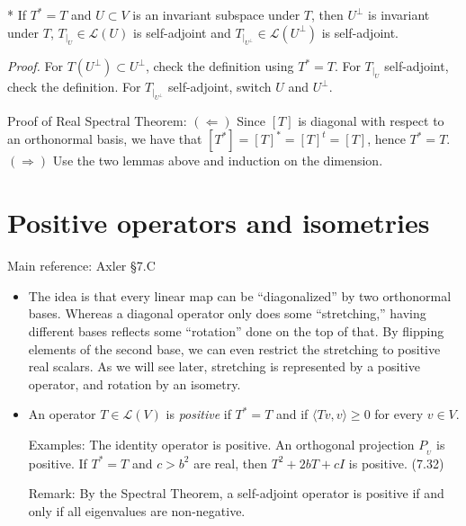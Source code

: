 \documentclass[11pt]{article}
\newcommand{\1}{\mathbf{1}}
\newcommand{\proj}[1]{P_{\!\!{}_{#1}}}
\newcommand{\0}{\mathbf{0}}
\renewcommand{\geq}{\geqslant}
\begin{document}
{\begin{itemize}
*
If $T^*=T$ and $U\subset V$ is an invariant subspace under $T$, then $U^\perp$ is invariant under $T$, $T_{|_U}\in{\mathcal{L}(U)}$ is self-adjoint and $T_{|_{U^\perp}}\in{\mathcal{L}(U^\perp)}$ is self-adjoint.

\emph{Proof.}
For $T(U^\perp) \subset U^\perp$, check the definition using $T^*=T$.
For $T_{|_{U}}$ self-adjoint, check the definition.
For $T_{|_{U^\perp}}$ self-adjoint, switch $U$ and $U^\perp$.

Proof of Real Spectral Theorem:
$(\Leftarrow)$
Since $[T]$ is diagonal with respect to an orthonormal basis, we have that $[T^*]=[T]^*=[T]^t=[T]$, hence $T^*=T$.
\\
$(\Rightarrow)$
Use the two lemmas above and induction on the dimension.

\end{itemize}


\clearpage
\section{Positive operators and isometries}

Main reference:
Axler \S7.C

\begin{itemize}

\item


The idea is that every linear map can be ``diagonalized'' by two orthonormal bases.
Whereas a diagonal operator only does some ``stretching,'' having different bases reflects some ``rotation'' done on the top of that.
By flipping elements of the second base, we can even restrict the stretching to positive real scalars.
As we will see later, stretching is represented by a positive operator, and rotation by an isometry.

\item

An operator $T\in\mathcal{L}(V)$ is \emph{positive} if $T^*=T$ and if $\langle Tv,v\rangle \geq 0$ for every $v\in V$.

Examples:
The identity operator is positive.
An orthogonal projection $\proj{U}$ is positive.
If $T^*=T$ and $c > b^2$ are real, then $T^2 + 2 b T + cI$ is positive.
(7.32)

Remark:
By the Spectral Theorem, a self-adjoint operator is positive if and only if all eigenvalues are non-negative.


\end{itemize}}
\end{document}
